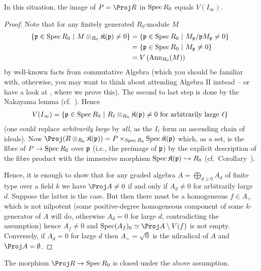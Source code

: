 \documentclass[a4paper,parskip=half,numbers=enddot, DIV=12]{scrreprt}
\begin{document}
\begin{prop}
    In this situation, the image of $P=\Proj R$ in $\operatorname{Spec} R_0$ equals $V(I_\infty)$.
\end{prop}
\begin{proof}
    Note that for any finitely generated $R_0$-module $M$ 
    \begin{align*}
        \left\{\mathfrak{p}\in \operatorname{Spec} R_0\ \middle|\  M\otimes_{R_0}\mathfrak{K}(\mathfrak{p})\neq 0\right\} &= \left\{\mathfrak{p}\in \operatorname{Spec} R_0 \ \middle|\  M_{\mathfrak{p}}/\mathfrak{p} M_{\mathfrak{p}} \neq 0\right\}\\
        &= \left\{\mathfrak{p}\in \operatorname{Spec} R_0\ \middle|\  M_{\mathfrak{p}}\neq 0\right\}\\
        &= V\left(\operatorname{Ann}_{R_0}(M)\right)
    \end{align*}
    by well-known facts from commutative Algebra (which you should be familiar with, otherwise, you may want to think about attending Algebra $\mathrm{II}$ instead -- or have a look at \cite[Lemma~3.4.1]{alg2}, where we prove this). The second to last step is done by the Nakayama lemma (cf.\ \cite[Proposition~1.2.3]{alg2}). Hence 
    \begin{align*}
        V(I_\infty) = \left\{\mathfrak{p}\in \operatorname{Spec} R_0\ \middle|\  R_\ell\otimes_{R_0} \mathfrak{K}(\mathfrak{p})\neq 0 \text{ for arbitrarily large } \ell\right\}
    \end{align*}
    (one could replace \emph{arbitrarily large} by \emph{all}, as the $I_\ell$ form an ascending chain of ideals). Now $\Proj(R\otimes_{R_0} \KK(\pp)) = P\times_{\Spec R_0} \Spec\KK(\pp)$ which, as a set, is the fibre of $P\morphism \Spec R_0$ over $\mathfrak{p}$ (i.e., the preimage of $\mathfrak{p}$) by the explicit description of the fibre product with the immersive morphism $\Spec \KK(\pp) \monomorphism R_0$ (cf.\ Corollary~). 
    
    Hence, it is enough to show that for any graded algebra $A=\bigoplus_{d\geq 0}A_d$ of finite type over a field $k$ we have $\Proj A\neq 0$ if and only if $A_d \neq 0$ for arbitrarily large $d$. Suppose the latter is the case. But then there must be a homogeneous $f\in A_+$ which is not nilpotent (some positive-degree homogeneous component of some $k$-generator of $A$ will do, otherwise $A_d=0$ for large $d$, contradicting the assumption) hence $A_f \neq 0$ and $\Spec(A_f)_0 \simeq \Proj A\setminus V(f)$ is not empty. Conversely, if $A_d = 0$ for large $d$ then $A_+ = \sqrt{0}$ is the nilradical of $A$ and $\Proj A = \emptyset$.
\end{proof}
\begin{cor}
    The morphism $\Proj R \morphism \Spec R_0$ is closed under the above assumption.
\end{cor}
\end{document}
